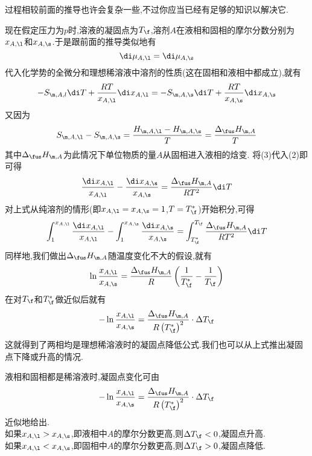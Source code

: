 \documentclass{ctexart}
\begin{document}
过程相较前面的推导也许会复杂一些,不过你应当已经有足够的知识以解决它.
\begin{derivation}\setcounter{equation}{0}
    现在假定压力为$p$时,溶液的凝固点为$T_\f$,溶剂$A$在液相和固相的摩尔分数分别为$x_{A,\l}$和$x_{A,\s}$.于是跟前面的推导类似地有
    \begin{equation}
        \di\mu_{A,\l}=\di\mu_{A,\s}
    \end{equation}
    代入化学势的全微分和理想稀溶液中溶剂的性质(这在固相和液相中都成立),就有
    \begin{equation}
        -S_{\m,A,l}\di T+\dfrac{RT}{x_{A,\l}}\di x_{A,\l}=-S_{\m,A,\s}\di T+\dfrac{RT}{x_{A,\s}}\di x_{A,\s}
    \end{equation}
    又因为
    \begin{equation}
        S_{\m,A,\l}-S_{\m,A,\s}
        =\dfrac{H_{\m,A,\l}-H_{\m,A,\s}}{T}
        =\dfrac{\Delta_{\fus}H_{\m,A}}{T}
    \end{equation}
    其中$\Delta_{\fus}H_{\m,A}$为此情况下单位物质的量$A$从固相进入液相的焓变.%
    将(3)代入(2)即可得
    \begin{equation}
        \dfrac{\di x_{A,\l}}{x_{A,\l}}-\dfrac{\di x_{A,\s}}{x_{A,\s}}
        =\dfrac{\Delta_{\fus}H_{\m,A}}{RT^2}\di T
    \end{equation}
    对上式从纯溶剂的情形(即$x_{A,\l}=x_{A,\s}=1$,$T=T_\f^\ast$)开始积分,可得
    \begin{equation}
        \int_{1}^{x_{A,\l}}\dfrac{\di x_{A,\l}}{x_{A,\l}}-
        \int_{1}^{x_{A,\s}}\dfrac{\di x_{A,\s}}{x_{A,\s}}
        =\int_{T_\f^\ast}^{T_\f}\dfrac{\Delta_{\fus}H_{\m,A}}{RT^2}\di T
    \end{equation}
    同样地,我们做出$\Delta_{\fus}H_{\m,A}$随温度变化不大的假设,就有
    \begin{equation}
        \ln\dfrac{x_{A,\l}}{x_{A,\s}}
        =\dfrac{\Delta_{\fus}H_{\m,A}}{R}\left(\dfrac{1}{T_\f^\ast}-\dfrac{1}{T_\f}\right)
    \end{equation}
    在对$T_\f$和$T_\f^\ast$做近似后就有
    \begin{equation}
        -\ln\dfrac{x_{A,\l}}{x_{A,\s}}
        =\dfrac{\Delta_{\fus}H_{\m,A}}{R\left(T_\f^\ast\right)^2}\cdot\Delta T_\f
    \end{equation}
    这就得到了两相均是理想稀溶液时的凝固点降低公式.我们也可以从上式推出凝固点下降或升高的情况.
\end{derivation}
\begin{theorem}[4C.3.2 固相为固溶体时的凝固点变化]
    液相和固相都是稀溶液时,凝固点变化可由
    \[-\ln\dfrac{x_{A,\l}}{x_{A,\s}}
    =\dfrac{\Delta_{\fus}H_{\m,A}}{R\left(T_\f^\ast\right)^2}\cdot\Delta T_\f\]
    近似地给出.\\
    如果$x_{A,\l}>x_{A,\s}$,即液相中$A$的摩尔分数更高,则$\Delta T_\f<0$,凝固点升高.\\
    如果$x_{A,\l}<x_{A,\s}$,即固相中$A$的摩尔分数更高,则$\Delta T_\f>0$,凝固点降低.
\end{theorem}
\end{document}
